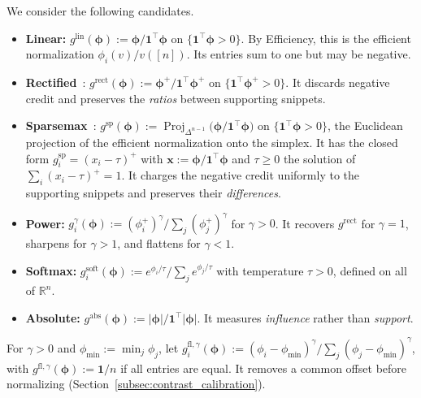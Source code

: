 We consider the following candidates.
\begin{itemize}
    \item \textbf{Linear:} $g^{\text{lin}}(\boldsymbol{\phi}) := \boldsymbol{\phi} / \mathbf{1}^\top \boldsymbol{\phi}$ on $\{\mathbf{1}^\top \boldsymbol{\phi} > 0\}$. By Efficiency, this is the efficient normalization $\phi_i(v) / v([n])$. Its entries sum to one but may be negative.
    \item \textbf{Rectified}~\cite{nematov2025source}: $g^{\text{rect}}(\boldsymbol{\phi}) := \boldsymbol{\phi}^+ / \mathbf{1}^\top \boldsymbol{\phi}^+$ on $\{\mathbf{1}^\top \boldsymbol{\phi}^+ > 0\}$. It discards negative credit and preserves the \emph{ratios} between supporting snippets.
    \item \textbf{Sparsemax}~\cite{martins2016softmax}: $g^{\text{sp}}(\boldsymbol{\phi}) := \operatorname{Proj}_{\Delta^{n-1}}\big(\boldsymbol{\phi} / \mathbf{1}^\top \boldsymbol{\phi}\big)$ on $\{\mathbf{1}^\top \boldsymbol{\phi} > 0\}$, the Euclidean projection of the efficient normalization onto the simplex. It has the closed form $g^{\text{sp}}_i = (x_i - \tau)^+$ with $\mathbf{x} := \boldsymbol{\phi}/\mathbf{1}^\top\boldsymbol{\phi}$ and $\tau \ge 0$ the solution of $\sum_i (x_i - \tau)^+ = 1$. It charges the negative credit uniformly to the supporting snippets and preserves their \emph{differences}.
    \item \textbf{Power:} $g^{\gamma}_i(\boldsymbol{\phi}) := (\phi_i^+)^\gamma / \sum_j (\phi_j^+)^\gamma$ for $\gamma > 0$. It recovers $g^{\text{rect}}$ for $\gamma = 1$, sharpens for $\gamma > 1$, and flattens for $\gamma < 1$.
    \item \textbf{Softmax:} $g^{\text{soft}}_i(\boldsymbol{\phi}) := e^{\phi_i/\tau} / \sum_j e^{\phi_j/\tau}$ with temperature $\tau > 0$, defined on all of $\mathbb{R}^n$.
    \item \textbf{Absolute:} $g^{\text{abs}}(\boldsymbol{\phi}) := |\boldsymbol{\phi}| / \mathbf{1}^\top |\boldsymbol{\phi}|$. It measures \emph{influence} rather than \emph{support}.
\end{itemize}
\begin{definition}\label{def:floor_link}
For $\gamma > 0$ and $\phi_{\min} := \min_j \phi_j$, let $g^{\text{fl},\gamma}_i(\boldsymbol{\phi}) := (\phi_i - \phi_{\min})^\gamma / \sum_j (\phi_j - \phi_{\min})^\gamma$, with $g^{\text{fl},\gamma}(\boldsymbol{\phi}) := \mathbf{1}/n$ if all entries are equal. It removes a common offset before normalizing (Section~\ref{subsec:contrast_calibration}).
\end{definition}

